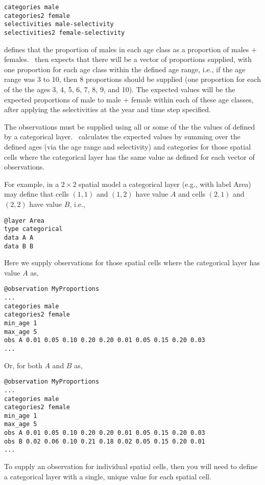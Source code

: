 \begin{verbatim}
categories male
categories2 female
selectivities male-selectivity
selectivities2 female-selectivity
\end{verbatim}

defines that the proportion of males in each age class as a proportion of males $+$ females. \SPM\ then expects that there will be a vector of proportions supplied, with one proportion for each age class within the defined age range, i.e., if the age range was 3 to 10, then 8 proportions should be supplied (one proportion for each of the the ages 3, 4, 5, 6, 7, 8, 9, and 10). The expected values will be the expected proportions of male to male $+$ female within each of these age classes, after applying the selectivities at the year and time step specified. 

The observations must be supplied using all or some of the the values of defined by a categorical layer. \SPM\ calculates the expected values by summing over the defined ages (via the age range and selectivity) and categories for those spatial cells where the categorical layer has the same value as defined for each vector of observations.

For example, in a $2 \times 2$ spatial model a categorical layer (e.g., with label Area) may define that cells $(1,1)$ and $(1,2)$ have value $A$ and cells $(2,1)$ and $(2,2)$ have value $B$, i.e.,

\begin{verbatim}
@layer Area
type categorical
data A A 
data B B
\end{verbatim}

Here we supply observations for those spatial cells where the categorical layer has value $A$ as, 

\begin{verbatim}
@observation MyProportions
...
categories male 
categories2 female
min_age 1
max_age 5
obs A 0.01 0.05 0.10 0.20 0.20 0.01 0.05 0.15 0.20 0.03
...
\end{verbatim}

Or, for both $A$ and $B$ as,

\begin{verbatim}
@observation MyProportions
...
categories male
categories2 female
min_age 1
max_age 5
obs A 0.01 0.05 0.10 0.20 0.20 0.01 0.05 0.15 0.20 0.03
obs B 0.02 0.06 0.10 0.21 0.18 0.02 0.05 0.15 0.20 0.01
...
\end{verbatim}

To supply an observation for individual spatial cells, then you will need to define a categorical layer with a single, unique value for each spatial cell. 

